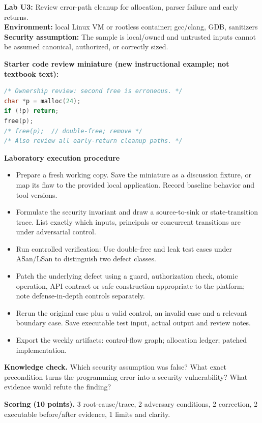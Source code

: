 \documentclass[10pt,letterpaper]{article}
\begin{document}
\begin{insight}\textbf{Lab U3:} Review error-path cleanup for allocation, parser failure and early returns.\\\textbf{Environment:} local Linux VM or rootless container; gcc/clang, GDB, sanitizers\\\textbf{Security assumption:} The sample is local/owned and untrusted inputs cannot be assumed canonical, authorized, or correctly sized.\end{insight}
\textbf{Starter code review miniature (new instructional example; not textbook text):}
\begin{lstlisting}[language=C]
/* Ownership review: second free is erroneous. */
char *p = malloc(24);
if (!p) return;
free(p);
/* free(p);  // double-free; remove */
/* Also review all early-return cleanup paths. */
\end{lstlisting}
\textbf{Laboratory execution procedure}
\begin{itemize}[leftmargin=*,itemsep=2pt]
\item Prepare a fresh working copy. Save the miniature as a discussion fixture, or map its flaw to the provided local application. Record baseline behavior and tool versions.
\item Formulate the security invariant and draw a source-to-sink or state-transition trace. List exactly which inputs, principals or concurrent transitions are under adversarial control.
\item Run controlled verification: Use double-free and leak test cases under ASan/LSan to distinguish two defect classes.
\item Patch the underlying defect using a guard, authorization check, atomic operation, API contract or safe construction appropriate to the platform; note defense-in-depth controls separately.
\item Rerun the original case plus a valid control, an invalid case and a relevant boundary case. Save executable test input, actual output and review notes.
\item Export the weekly artifacts: control-flow graph; allocation ledger; patched implementation.
\end{itemize}
\textbf{Knowledge check.} Which security assumption was false? What exact precondition turns the programming error into a security vulnerability? What evidence would refute the finding?

\textbf{Scoring (10 points).} 3 root-cause/trace, 2 adversary conditions, 2 correction, 2 executable before/after evidence, 1 limits and clarity.
\end{document}
